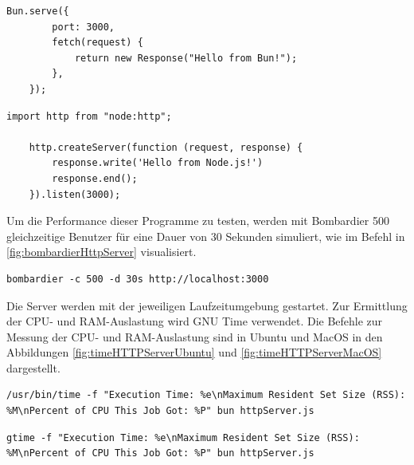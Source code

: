\begin{lstlisting}[caption={[HTTP-Server Bun]HTTP-Server Bun\\\textit{Quelle: Eigene Darstellung}},label={fig:httpServerBun}]
	Bun.serve({
		port: 3000,
		fetch(request) {
			return new Response("Hello from Bun!");
		},
	});
\end{lstlisting}

\begin{lstlisting}[caption={[HTTP-Server Node.js]HTTP-Server Node.js\\\textit{Quelle: Eigene Darstellung}},label={fig:httpServerNode}]
	import http from "node:http";
	
	http.createServer(function (request, response) {
		response.write('Hello from Node.js!')
		response.end();
	}).listen(3000);
\end{lstlisting}

\noindent
Um die Performance dieser Programme zu testen, werden mit Bombardier 500 gleichzeitige Benutzer für eine Dauer von 30 Sekunden simuliert, wie im Befehl in \autoref{fig:bombardierHttpServer} visualisiert.

\begin{lstlisting}[caption={[Bombardier HTTP-Server]Bombardier HTTP-Server\\\textit{Quelle: Eigene Darstellung}},label={fig:bombardierHttpServer}]
	bombardier -c 500 -d 30s http://localhost:3000
\end{lstlisting}

\noindent
Die Server werden mit der jeweiligen Laufzeitumgebung gestartet. Zur Ermittlung der CPU- und RAM-Auslastung wird GNU Time verwendet. Die Befehle zur Messung der CPU- und RAM-Auslastung sind in Ubuntu und MacOS in den Abbildungen \ref{fig:timeHTTPServerUbuntu} und \ref{fig:timeHTTPServerMacOS} dargestellt.

\begin{lstlisting}[caption={[CPU- und RAM-Messung auf Ubuntu]CPU- und RAM-Messung auf Ubuntu\\\textit{Quelle: Eigene Darstellung}},label={fig:timeHTTPServerUbuntu}]
	/usr/bin/time -f "Execution Time: %e\nMaximum Resident Set Size (RSS): %M\nPercent of CPU This Job Got: %P" bun httpServer.js
\end{lstlisting}

\begin{lstlisting}[caption={[CPU- und RAM-Messung auf macOS]CPU- und RAM-Messung auf macOS\\\textit{Quelle: Eigene Darstellung}},label={fig:timeHTTPServerMacOS}]
	gtime -f "Execution Time: %e\nMaximum Resident Set Size (RSS): %M\nPercent of CPU This Job Got: %P" bun httpServer.js
\end{lstlisting}

